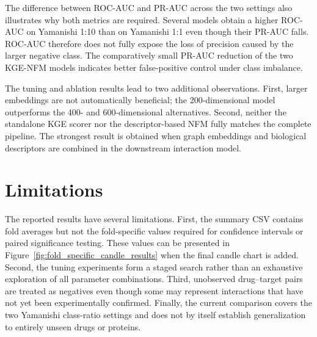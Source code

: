 The difference between ROC-AUC and PR-AUC across the two settings also
illustrates why both metrics are required. Several models obtain a higher
ROC-AUC on Yamanishi 1:10 than on Yamanishi 1:1 even though their PR-AUC falls.
ROC-AUC therefore does not fully expose the loss of precision caused by the
larger negative class. The comparatively small PR-AUC reduction of the two
KGE-NFM models indicates better false-positive control under class imbalance.

The tuning and ablation results lead to two additional observations. First,
larger embeddings are not automatically beneficial; the 200-dimensional model
outperforms the 400- and 600-dimensional alternatives. Second, neither the
standalone KGE scorer nor the descriptor-based NFM fully matches the complete
pipeline. The strongest result is obtained when graph embeddings and biological
descriptors are combined in the downstream interaction model.

\section{Limitations}

The reported results have several limitations. First, the summary CSV contains
fold averages but not the fold-specific values required for confidence
intervals or paired significance testing. These values can be presented in
Figure~\ref{fig:fold_specific_candle_results} when the final candle chart is
added. Second, the tuning experiments form a staged search rather than an
exhaustive exploration of all parameter combinations. Third, unobserved
drug--target pairs are treated as negatives even though some may represent
interactions that have not yet been experimentally confirmed. Finally, the
current comparison covers the two Yamanishi class-ratio settings and does not
by itself establish generalization to entirely unseen drugs or proteins.
